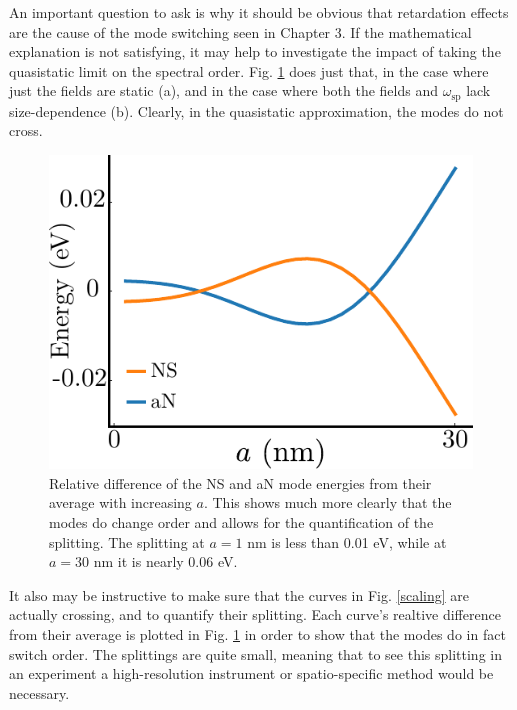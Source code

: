 \documentclass [11pt, proquest] {uwthesis}[2016/11/22]
\begin{document}
An important question to ask is why it should be obvious that retardation effects are the cause of the mode switching seen in Chapter 3. If the mathematical explanation is not satisfying, it may help to investigate the impact of taking the quasistatic limit on the spectral order. Fig. \ref{diff_scale} does just that, in the case where just the fields are static (a), and in the case where both the fields and $\omega_{\textrm{sp}}$ lack size-dependence (b). Clearly, in the quasistatic approximation, the modes do not cross.

\newpage
\begin{figure}
\begin{centering}
\includegraphics{eig_diff_scale.pdf}
\caption{Relative difference of the NS and aN mode energies from their average with increasing $a$. This shows much more clearly that the modes do change order and allows for the quantification of the splitting. The splitting at $a = 1$ nm is less than 0.01 eV, while at $a = 30$ nm it is nearly 0.06 eV.}
\label{diff_scale}
\end{centering}
\end{figure}

It also may be instructive to make sure that the curves in Fig. \ref{scaling} are actually crossing, and to quantify their splitting. Each curve's realtive difference from their average is plotted in Fig. \ref{diff_scale} in order to show that the modes do in fact switch order. The splittings are quite small, meaning that to see this splitting in an experiment a high-resolution instrument or spatio-specific method would be necessary.
\end{document}
